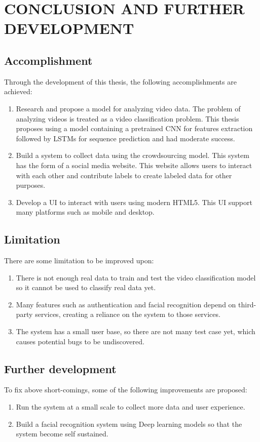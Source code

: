 \chapter{CONCLUSION AND FURTHER DEVELOPMENT}

\section{Accomplishment}
Through the development of this thesis, the following accomplishments are achieved:
\begin{enumerate}
    \item Research and propose a model for analyzing video data. The problem of analyzing videos is treated as a video classification problem. This thesis proposes using a model containing a pretrained CNN for features extraction followed by LSTMs for sequence prediction and had moderate success.
    \item Build a system to collect data using the crowdsourcing model. This system has the form of a social media website. This website allows users to interact with each other and contribute labels to create labeled data for other purposes.
    \item Develop a UI to interact with users using modern HTML5. This UI support many platforms such as mobile and desktop.
\end{enumerate}


\section{Limitation}
There are some limitation to be improved upon:

\begin{enumerate}

\item There is not enough real data to train and test the video classification model so it cannot be used to classify real data yet.
\item Many features such as authentication and facial recognition depend on third-party services, creating a reliance on the system to those services.
\item The system has a small user base, so there are not many test case yet, which causes potential bugs to be undiscovered.
 
\end{enumerate}

\section{Further development}
To fix above short-comings, some of the following improvements are proposed:

\begin{enumerate}
\item Run the system at a small scale to collect more data and user experience.
\item Build a facial recognition system using Deep learning models so that the system become self sustained.
\end{enumerate}


